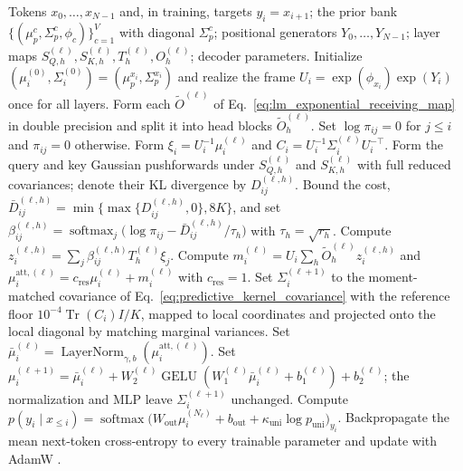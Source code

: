 \documentclass[twoside,11pt]{article}
\begin{document}
\begin{algorithm}[t]
\caption{Causal Gaussian attention with the exponential content chart, as evaluated}
\label{alg:predictive_content_current}
\begin{algorithmic}[1]
\REQUIRE Tokens $x_0,\ldots,x_{N-1}$ and, in training, targets $y_i=x_{i+1}$; the prior bank $\{(\mu_p^c,\Sigma_p^c,\phi_c)\}_{c=1}^V$ with diagonal $\Sigma_p^c$; positional generators $Y_0,\ldots,Y_{N-1}$; layer maps $S_{Q,h}^{(\ell)},S_{K,h}^{(\ell)},T_h^{(\ell)},O_h^{(\ell)}$; decoder parameters.
\STATE Initialize $(\mu_i^{(0)},\Sigma_i^{(0)})=(\mu_p^{x_i},\Sigma_p^{x_i})$ and realize the frame $U_i=\exp(\phi_{x_i})\exp(Y_i)$ once for all layers.
\STATE Form each $\widetilde O^{(\ell)}$ of Eq.~\eqref{eq:lm_exponential_receiving_map} in double precision and split it into head blocks $\widetilde O_h^{(\ell)}$.
\STATE Set $\log\pi_{ij}=0$ for $j\le i$ and $\pi_{ij}=0$ otherwise.
\STATE Form $\xi_i=U_i^{-1}\mu_i^{(\ell)}$ and $C_i=U_i^{-1}\Sigma_i^{(\ell)}U_i^{-\top}$.
\STATE Form the query and key Gaussian pushforwards under $S_{Q,h}^{(\ell)}$ and $S_{K,h}^{(\ell)}$ with full reduced covariances; denote their KL divergence by $D_{ij}^{(\ell,h)}$.
\STATE Bound the cost, $\bar D_{ij}^{(\ell,h)}=\min\{\max\{D_{ij}^{(\ell,h)},0\},8K\}$, and set $\beta_{ij}^{(\ell,h)}=\operatorname{softmax}_{j}\bigl(\log\pi_{ij}-\bar D_{ij}^{(\ell,h)}/\tau_h\bigr)$ with $\tau_h=\sqrt{r_h}$.
\STATE Compute $z_i^{(\ell,h)}=\sum_j\beta_{ij}^{(\ell,h)}T_h^{(\ell)}\xi_j$.
\ENDFOR
\STATE Compute $m_i^{(\ell)}=U_i\sum_h \widetilde O_h^{(\ell)}z_i^{(\ell,h)}$ and $\mu_i^{\mathrm{att},(\ell)}=c_{\mathrm{res}}\mu_i^{(\ell)}+m_i^{(\ell)}$ with $c_{\mathrm{res}}=1$.
\STATE Set $\Sigma_i^{(\ell+1)}$ to the moment-matched covariance of Eq.~\eqref{eq:predictive_kernel_covariance} with the reference floor $10^{-4}\operatorname{Tr}(C_i)I/K$, mapped to local coordinates and projected onto the local diagonal by matching marginal variances.
\STATE Set $\bar\mu_i^{(\ell)}=\operatorname{LayerNorm}_{\gamma,b}(\mu_i^{\mathrm{att},(\ell)})$.
\STATE Set $\mu_i^{(\ell+1)}=\bar\mu_i^{(\ell)}+W_2^{(\ell)}\operatorname{GELU}(W_1^{(\ell)}\bar\mu_i^{(\ell)}+b_1^{(\ell)})+b_2^{(\ell)}$; the normalization and MLP leave $\Sigma_i^{(\ell+1)}$ unchanged.
\ENDFOR
\STATE Compute $p(y_i\mid x_{\le i})=\operatorname{softmax}\bigl(W_{\mathrm{out}}\mu_i^{(N_\ell)}+b_{\mathrm{out}}+\kappa_{\mathrm{uni}}\log p_{\mathrm{uni}}\bigr)_{y_i}$.
\STATE Backpropagate the mean next-token cross-entropy to every trainable parameter and update with AdamW \citep{Loshchilov2019AdamW}.
\ENDIF
\end{algorithmic}
\end{algorithm}
\end{document}
